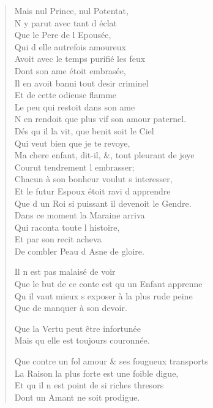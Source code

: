 \begin{verse}
\vin Mais nul Prince, nul Potentat, \\
\vin N\textquotesingle{} y parut avec tant d\textquotesingle{} éclat \\
\vin Que le Pere de l\textquotesingle{} Epousée, \\
\vin Qui d\textquotesingle{} elle autrefois amoureux \\
Avoit avec le temps purifié les feux \\
\vin Dont son ame étoit embrasée, \\
Il en avoit banni tout desir criminel \\
\vin Et de cette odieuse flamme \\
\vin Le peu qui restoit dans son ame \\
N\textquotesingle{} en rendoit que plus vif son amour paternel. \\
\vin Dés qu\textquotesingle{} il la vit, que benit soit le Ciel \\
\vin Qui veut bien que je te revoye, \\
Ma chere enfant, dit-il, \&, tout pleurant de joye \\
\vin Courut tendrement l\textquotesingle{} embrasser; \\
Chacun à son bonheur voulut s\textquotesingle{} interesser, \\
Et le futur Espoux étoit ravi d\textquotesingle{} apprendre \\
Que d\textquotesingle{} un Roi si puissant il devenoit le Gendre. \\
\vin Dans ce moment la Maraine arriva \\
\vin Qui raconta toute l\textquotesingle{} histoire, \\
\vin Et par son recit acheva \\
\vin De combler Peau d\textquotesingle{} Asne de gloire.

\vin Il n\textquotesingle{} est pas malaisé de voir \\
Que le but de ce conte est qu\textquotesingle{} un Enfant apprenne \\
Qu\textquotesingle{} il vaut mieux s\textquotesingle{} exposer à la plus rude peine \\
\vin Que de manquer à son devoir.

\vin Que la Vertu peut être infortunée \\
\vin Mais qu\textquotesingle{} elle est toujours couronnée.

Que contre un fol amour \& ses fougueux transports \\
La Raison la plus forte est une foible digue, \\
\vin Et qu\textquotesingle{} il n\textquotesingle{} est point de si riches thresors \\
\vin Dont un Amant ne soit prodigue.


\end{verse}
